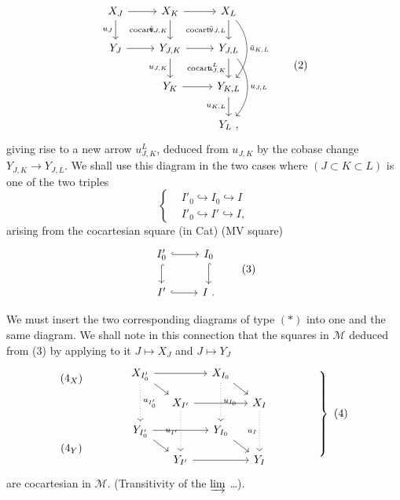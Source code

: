 \documentclass[11pt]{article}
\newcommand{\printedpage}[1]{\marginpar{\footnotesize p.~#1}}
\newcommand{\msp}[1]{\marginpar{\footnotesize [#1]}}
\newcommand{\cocart}{\text{\scriptsize cocart.}}
\begin{document}
\printedpage{9}
\[
\begin{tikzcd}
X_J \arrow[r] \arrow[d, "u_J"'] \arrow[dr, phantom, "\cocart"] & X_K \arrow[r] \arrow[d, "\tilde{u}_{J,K}"'] \arrow[dr, phantom, "\cocart"] & X_L \arrow[d, "\tilde{u}_{J,L}"'] \arrow[dd, bend left=40, "\tilde{u}_{K,L}"] \\
Y_J \arrow[r] & Y_{J,K} \arrow[r] \arrow[d, "u_{J,K}"'] \arrow[dr, phantom, "\cocart"] & Y_{J,L} \arrow[d, "u^L_{J,K}"'] \arrow[dd, bend left=40, "u_{J,L}"] \\
 & Y_K \arrow[r] & Y_{K,L} \arrow[d, "u_{K,L}"'] \\
 & & Y_L\ ,
\end{tikzcd}
\tag*{(2)}
\]
giving rise to a new arrow $u^L_{J,K}$, deduced from $u_{J,K}$ by the cobase change \msp{page 15} $Y_{J,K} \longrightarrow Y_{J,L}$. We shall use this diagram in the two cases where $(J \subset K \subset L)$ is one of the two triples
\[
\left\{
\begin{aligned}
& I'_0 \hookrightarrow I_0 \hookrightarrow I \\
& I'_0 \hookrightarrow I' \hookrightarrow I,
\end{aligned}
\right.
\]
arising from the cocartesian square (in Cat) (MV square)
\[
\begin{tikzcd}
I'_0 \arrow[r, hook] \arrow[d, hook] & I_0 \arrow[d, hook] \\
I' \arrow[r, hook] & I\ .
\end{tikzcd}
\tag*{(3)}
\]

We must insert the two corresponding diagrams of type $(*)$ into one and the same diagram. We shall note in this connection that the squares in $\mathcal{M}$ deduced from (3) by applying to it $J \longmapsto X_J$ and $J \longmapsto Y_J$
\[
\begin{matrix} (4_X) \\[12ex] (4_Y) \end{matrix}
\qquad\qquad
\begin{tikzcd}[column sep=small, row sep=small]
X_{I'_0} \arrow[rr] \arrow[dr] \arrow[dd, dotted, "u_{I'_0}"] & & X_{I_0} \arrow[dr] \arrow[dd, dotted, "u_{I_0}"] & \\
 & X_{I'} \arrow[rr] \arrow[dd, dotted, "u_{I'}"'] & & X_I \arrow[dd, dotted, "u_I"'] \\
Y_{I'_0} \arrow[rr] \arrow[dr] & & Y_{I_0} \arrow[dr] & \\
 & Y_{I'} \arrow[rr] & & Y_I
\end{tikzcd}
\qquad\qquad
\left.\vrule height 9ex depth 9ex width 0pt\right\}\ (4)
\]
are cocartesian in $\mathcal{M}$. (Transitivity of the $\varinjlim$ \ldots). %
\end{document}
